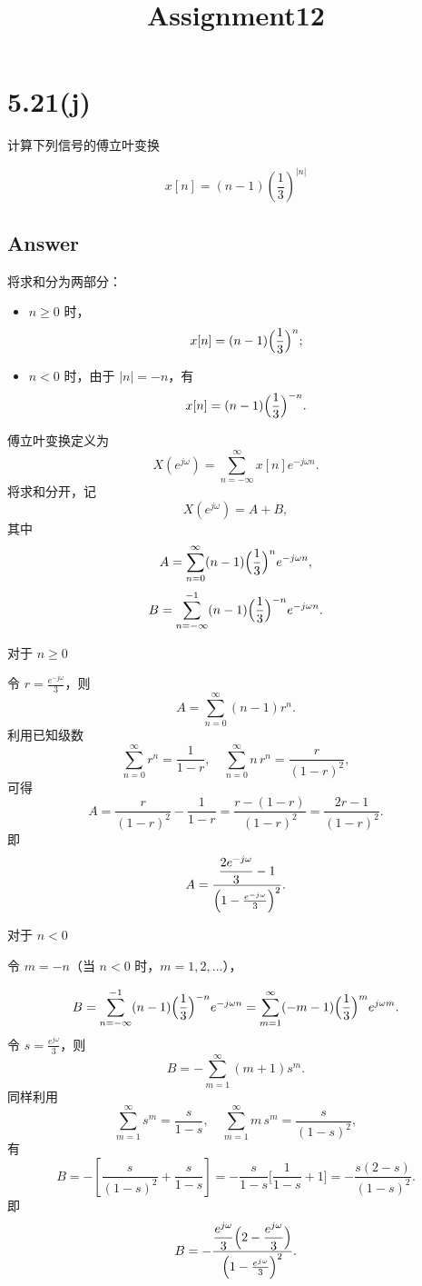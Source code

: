 \documentclass[11pt]{article}
\title{Assignment12}
\providecommand{\tightlist}{%
      \setlength{\itemsep}{0pt}\setlength{\parskip}{0pt}}
\begin{document}
    
    \maketitle
    
    

    
    \section{5.21(j)}\label{j}

计算下列信号的傅立叶变换

\[
x[n] = (n - 1)\left(\frac{1}{3} \right)^{|n|}
\]

\subsection{Answer}\label{answer}

将求和分为两部分：

\begin{itemize}
\tightlist
\item
  \(n\ge0\) 时， \[
  x[n]=(n-1)\Bigl(\frac{1}{3}\Bigr)^n;
  \]
\item
  \(n<0\) 时，由于 \(|n|=-n\)，有 \[
  x[n]=(n-1)\Bigl(\frac{1}{3}\Bigr)^{-n}.
  \]
\end{itemize}

傅立叶变换定义为 \[
X(e^{j\omega})=\sum_{n=-\infty}^{\infty} x[n]e^{-j\omega n}.
\] 将求和分开，记 \[
X(e^{j\omega})=A+B,
\] 其中 \[
A=\sum_{n=0}^{\infty}(n-1)\Bigl(\frac{1}{3}\Bigr)^n e^{-j\omega n},
\] \[
B=\sum_{n=-\infty}^{-1}(n-1)\Bigl(\frac{1}{3}\Bigr)^{-n} e^{-j\omega n}.
\]

对于 \(n\ge0\)

令 \(r=\frac{e^{-j\omega}}{3}\)，则 \[
A=\sum_{n=0}^\infty (n-1)r^n.
\] 利用已知级数 \[
\sum_{n=0}^\infty r^n=\frac{1}{1-r},\quad \sum_{n=0}^\infty n\,r^n=\frac{r}{(1-r)^2},
\] 可得 \[
A=\frac{r}{(1-r)^2}-\frac{1}{1-r}
=\frac{r-(1-r)}{(1-r)^2}=\frac{2r-1}{(1-r)^2}.
\] 即 \[
A=\frac{\displaystyle \frac{2e^{-j\omega}}{3}-1}{\Bigl(1-\frac{e^{-j\omega}}{3}\Bigr)^2}.
\]

对于 \(n<0\)

令 \(m=-n\)（当 \(n<0\) 时，\(m=1,2,\dots\)），

\[
B=\sum_{n=-\infty}^{-1}(n-1)\Bigl(\frac{1}{3}\Bigr)^{-n} e^{-j\omega n}
=\sum_{m=1}^{\infty} (-m-1)\Bigl(\frac{1}{3}\Bigr)^{m} e^{j\omega m}.
\] 令 \(s=\frac{e^{j\omega}}{3}\)，则 \[
B=-\sum_{m=1}^\infty (m+1)s^m.
\] 同样利用 \[
\sum_{m=1}^\infty s^m=\frac{s}{1-s},\quad \sum_{m=1}^\infty m\,s^m=\frac{s}{(1-s)^2},
\] 有 \[
B=-\left[\frac{s}{(1-s)^2}+\frac{s}{1-s}\right]
=-\frac{s}{1-s}\Biggl[\frac{1}{1-s}+1\Biggr]
=-\frac{s(2-s)}{(1-s)^2}.
\] 即 \[
B=-\frac{\displaystyle \frac{e^{j\omega}}{3}\Bigl(2-\frac{e^{j\omega}}{3}\Bigr)}{\Bigl(1-\frac{e^{j\omega}}{3}\Bigr)^2}.
\]
\end{document}
